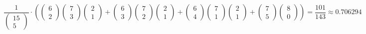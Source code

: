 \documentclass[10pt]{article}
\begin{document}
\begin{easylist}[enumerate]
    \[
        \frac{1}{\begin{pmatrix}15\\5\end{pmatrix} } \cdot
        \left(
            \begin{pmatrix}6\\2\end{pmatrix}\begin{pmatrix}7\\3\end{pmatrix}\begin{pmatrix}2\\1\end{pmatrix}+
            \begin{pmatrix}6\\3\end{pmatrix}\begin{pmatrix}7\\2\end{pmatrix}\begin{pmatrix}2\\1\end{pmatrix}+
            \begin{pmatrix}6\\4\end{pmatrix}\begin{pmatrix}7\\1\end{pmatrix}\begin{pmatrix}2\\1\end{pmatrix}+
            \begin{pmatrix}7\\5\end{pmatrix}\begin{pmatrix}8\\0\end{pmatrix} \right) =
        \boxed{\frac{101}{143} \approx 0.706294}
    \]

\end{easylist}
\end{document}

